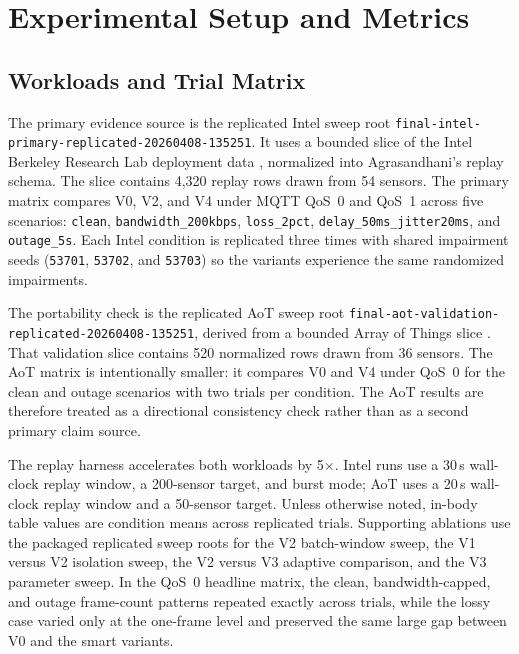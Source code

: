 \section{Experimental Setup and Metrics}

\subsection{Workloads and Trial Matrix}

The primary evidence source is the replicated Intel sweep root \nolinkurl{final-intel-primary-replicated-20260408-135251}. It uses a bounded slice of the Intel Berkeley Research Lab deployment data \cite{intelLabData}, normalized into Agrasandhani's replay schema. The slice contains 4{,}320 replay rows drawn from 54 sensors. The primary matrix compares V0, V2, and V4 under MQTT QoS~0 and QoS~1 across five scenarios: \nolinkurl{clean}, \nolinkurl{bandwidth_200kbps}, \nolinkurl{loss_2pct}, \nolinkurl{delay_50ms_jitter20ms}, and \nolinkurl{outage_5s}. Each Intel condition is replicated three times with shared impairment seeds (\nolinkurl{53701}, \nolinkurl{53702}, and \nolinkurl{53703}) so the variants experience the same randomized impairments.

The portability check is the replicated AoT sweep root \nolinkurl{final-aot-validation-replicated-20260408-135251}, derived from a bounded Array of Things slice \cite{aotCyberGIS}. That validation slice contains 520 normalized rows drawn from 36 sensors. The AoT matrix is intentionally smaller: it compares V0 and V4 under QoS~0 for the clean and outage scenarios with two trials per condition. The AoT results are therefore treated as a directional consistency check rather than as a second primary claim source.

The replay harness accelerates both workloads by 5$\times$. Intel runs use a 30\,s wall-clock replay window, a 200-sensor target, and burst mode; AoT uses a 20\,s wall-clock replay window and a 50-sensor target. Unless otherwise noted, in-body table values are condition means across replicated trials. Supporting ablations use the packaged replicated sweep roots for the V2 batch-window sweep, the V1 versus V2 isolation sweep, the V2 versus V3 adaptive comparison, and the V3 parameter sweep.
In the QoS~0 headline matrix, the clean, bandwidth-capped, and outage frame-count patterns repeated exactly across trials, while the lossy case varied only at the one-frame level and preserved the same large gap between V0 and the smart variants.


